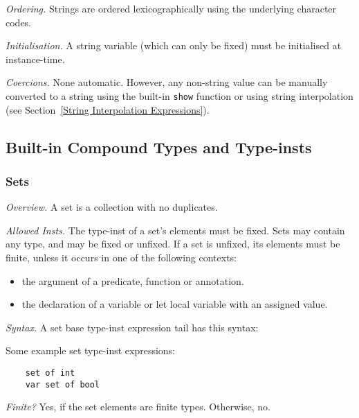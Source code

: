 \documentclass[10pt]{scrartcl}
\newcommand{\TyThing}[1]{\vspace{1.2mm}\noindent\emph{#1} }
\newcommand{\TyOverview}{\TyThing{Overview.}}
\newcommand{\TyInsts}{\TyThing{Allowed Insts.}}
\newcommand{\TySyntax}{\TyThing{Syntax.}}
\newcommand{\TyFiniteType}{\TyThing{Finite?}}
\newcommand{\TyOrdering}{\TyThing{Ordering.}}
\newcommand{\TyInit}{\TyThing{Initialisation.}}
\newcommand{\TyCoercions}{\TyThing{Coercions.}}
\begin{document}
\TyOrdering
Strings are ordered lexicographically using the underlying character codes.

\TyInit
A string variable (which can only be fixed) must be initialised at
instance-time.

\TyCoercions
None automatic.  However, any non-string value can be manually converted to
a string using the built-in \texttt{show} function or using string interpolation (see Section~\ref{String Interpolation Expressions}).

\subsection{Built-in Compound Types and Type-insts}
     \label{Built-in Compound Types}
\subsubsection{Sets}
        \label{Sets}
\TyOverview
A set is a collection with no duplicates.

\TyInsts
The type-inst of a set's elements must be fixed.  
Sets may contain any type, and may be fixed or unfixed.
If a set is unfixed, its elements must be finite, unless it occurs in one
of the following contexts:
\begin{itemize}
\item the argument of a predicate, function or annotation.
\item the declaration of a variable or let local variable with an
      assigned value.
\end{itemize}

\TySyntax
A set base type-inst expression tail has this syntax:
\begin{productions}
    \RuleSetTIExprTail
\end{productions}
Some example set type-inst expressions:
\begin{verbatim}
    set of int
    var set of bool
\end{verbatim}

\TyFiniteType
Yes, if the set elements are finite types.  Otherwise, no.
\end{document}

